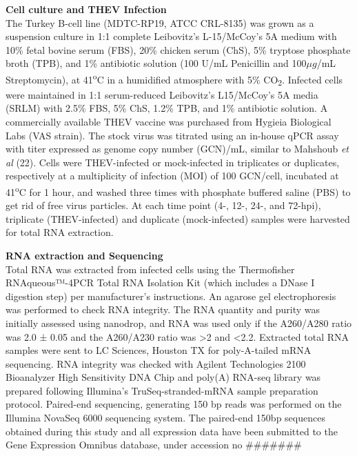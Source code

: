 \documentclass[
]{article}
\begin{document}
\textbf{Cell culture and THEV Infection}\\
The Turkey B-cell line (MDTC-RP19, ATCC CRL-8135) was grown as a
suspension culture in 1:1 complete Leibovitz's L-15/McCoy's 5A medium
with 10\% fetal bovine serum (FBS), 20\% chicken serum (ChS), 5\%
tryptose phosphate broth (TPB), and 1\% antibiotic solution (100 U/mL
Penicillin and 100\(\mu g\)/mL Streptomycin), at 41\textsuperscript{o}C
in a humidified atmosphere with 5\% CO\textsubscript{2}. Infected cells
were maintained in 1:1 serum-reduced Leibovitz's L15/McCoy's 5A media
(SRLM) with 2.5\% FBS, 5\% ChS, 1.2\% TPB, and 1\% antibiotic solution.
A commercially available THEV vaccine was purchased from Hygieia
Biological Labs (VAS strain). The stock virus was titrated using an
in-house qPCR assay with titer expressed as genome copy number (GCN)/mL,
similar to Mahshoub \emph{et al} (22). Cells were THEV-infected or
mock-infected in triplicates or duplicates, respectively at a
multiplicity of infection (MOI) of 100 GCN/cell, incubated at
41\textsuperscript{o}C for 1 hour, and washed three times with phosphate
buffered saline (PBS) to get rid of free virus particles. At each time
point (4-, 12-, 24-, and 72-hpi), triplicate (THEV-infected) and
duplicate (mock-infected) samples were harvested for total RNA
extraction.

\textbf{RNA extraction and Sequencing}\\
Total RNA was extracted from infected cells using the Thermofisher
RNAqueous™-4PCR Total RNA Isolation Kit (which includes a DNase I
digestion step) per manufacturer's instructions. An agarose gel
electrophoresis was performed to check RNA integrity. The RNA quantity
and purity was initially assessed using nanodrop, and RNA was used only
if the A260/A280 ratio was 2.0 ± 0.05 and the A260/A230 ratio was
\textgreater2 and \textless2.2. Extracted total RNA samples were sent to
LC Sciences, Houston TX for poly-A-tailed mRNA sequencing. RNA integrity
was checked with Agilent Technologies 2100 Bioanalyzer High Sensitivity
DNA Chip and poly(A) RNA-seq library was prepared following Illumina's
TruSeq-stranded-mRNA sample preparation protocol. Paired-end sequencing,
generating 150 bp reads was performed on the Illumina NovaSeq 6000
sequencing system. The paired-end 150bp sequences obtained during this
study and all expression data have been submitted to the Gene Expression
Omnibus database, under accession no \#\#\#\#\#\#\#
\end{document}
